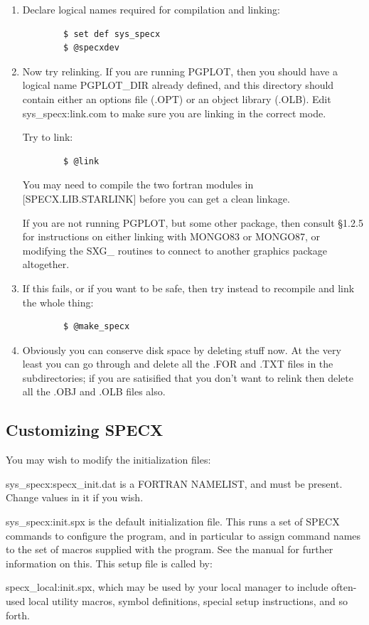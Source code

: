\documentclass[11pt,twoside]{report}
\begin{document}
\begin{enumerate}
\item Declare logical names required for compilation and linking:

\begin{verbatim}
        $ set def sys_specx
        $ @specxdev
\end{verbatim}

\item Now try relinking. If you are running PGPLOT, then you should have
a logical name PGPLOT\_DIR already defined, and this directory should
contain either an options file (.OPT) or an object library (.OLB).
Edit sys\_specx:link.com to make sure you are linking in the correct
mode.

Try to link:

\begin{verbatim}
        $ @link
\end{verbatim}

You may need to compile the two fortran modules in [SPECX.LIB.STARLINK]
before you can get a clean linkage.

If you are not running PGPLOT, but some other package, then consult
\S1.2.5 for instructions on either linking with MONGO83
or MONGO87, or modifying the SXG\_ routines to connect to another
graphics package altogether.

\item If this fails, or if you want to be safe, then try instead to recompile
and link the whole thing:

\begin{verbatim}
        $ @make_specx
\end{verbatim}

\item Obviously you can conserve disk space by deleting stuff now. At the
very least you can go through and delete all the .FOR and .TXT
files in the subdirectories; if you are satisified that you don't
want to relink then delete all the .OBJ and .OLB files also.

\end{enumerate}

\subsection{Customizing SPECX}

You may wish to modify the initialization files:

\begin{description}
\item{sys\_specx:specx\_init.dat} is a FORTRAN NAMELIST, and must be present.
Change values in it if you wish.
\item{sys\_specx:init.spx} is the default initialization file. This runs
a set of SPECX commands to configure the program, and in particular to
assign command names to the set of macros supplied with the program. See
the manual for further information on this. This setup file is called by:
\item{specx\_local:init.spx}, which may be used by your local manager to include
often-used local utility macros, symbol definitions, special setup instructions,
and so forth.
\end{description}
\end{document}

